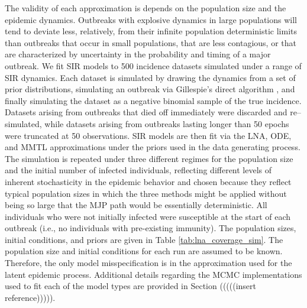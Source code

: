 The validity of each approximation is depends on the population size and the epidemic dynamics. Outbreaks with explosive dynamics in large populations will tend to deviate less, relatively, from their infinite population deterministic limits than outbreaks that occur in small populations, that are less contagious, or that are characterized by uncertainty in the probability and timing of a major outbreak. We fit SIR models to 500 incidence datasets simulated under a range of SIR dynamics. Each dataset is simulated by drawing the dynamics from a set of prior distributions, simulating an outbreak via Gillespie's direct algorithm \cite{gillespie1976general}, and finally simulating the dataset as a negative binomial sample of the true incidence. Datasets arising from outbreaks that died off immediately were discarded and re--simulated, while datasets arising from outbreaks lasting longer than 50 epochs were truncated at 50 observations. SIR models are then fit via the LNA, ODE, and MMTL approximations under the priors used in the data generating process. The simulation is repeated under three different regimes for the population size and the initial number of infected individuals, reflecting different levels of inherent stochasticity in the epidemic behavior and chosen because they reflect typical population sizes in which the three methods might be applied without being so large that the MJP path would be essentially deterministic. All individuals who were not initially infected were susceptible at the start of each outbreak (i.e., no individuals with pre-existing immunity). The population sizes, initial conditions, and priors are given in Table \ref{tab:lna_coverage_sim}. The population size and initial conditions for each run are assumed to be known. Therefore, the only model misspecification is in the approximation used for the latent epidemic process. Additional details regarding the MCMC implementations used to fit each of the model types are provided in Section (((((insert reference))))).

